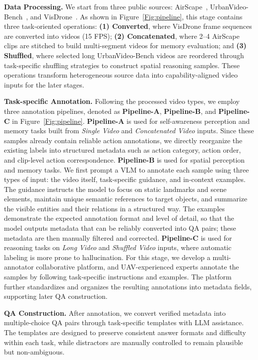 \documentclass[sigconf, screen, review, anonymous]{acmart}
\begin{document}
\noindent \textbf{Data Processing.}
We start from three public sources: AirScape~\cite{zhao2025airscape}, UrbanVideo-Bench~\cite{UrbanVideo-Bench}, and VisDrone~\cite{wen2019visdrone}. As shown in Figure~\ref{Fig:pipeline}, this stage contains three task-oriented operations: \textbf{(1) Converted}, where VisDrone frame sequences are converted into videos (15 FPS); \textbf{(2) Concatenated}, where 2--4 AirScape clips are stitched to build multi-segment videos for memory evaluation; and \textbf{(3) Shuffled}, where selected long UrbanVideo-Bench videos are reordered through task-specific shuffling strategies to construct spatial reasoning samples. These operations transform heterogeneous source data into capability-aligned video inputs for the later stages.

\noindent \textbf{Task-specific Annotation.}
Following the processed video types, we employ three annotation pipelines, denoted as \textbf{Pipeline-A}, \textbf{Pipeline-B}, and \textbf{Pipeline-C} in Figure~\ref{Fig:pipeline}. \textbf{Pipeline-A} is used for self-awareness perception and memory tasks built from \emph{Single Video} and \emph{Concatenated Video} inputs. Since these samples already contain reliable action annotations, we directly reorganize the existing labels into structured metadata such as action category, action order, and clip-level action correspondence. \textbf{Pipeline-B} is used for spatial perception and memory tasks. We first prompt a VLM to annotate each sample using three types of input: the video itself, task-specific guidance, and in-context examples. The guidance instructs the model to focus on static landmarks and scene elements, maintain unique semantic references to target objects, and summarize the visible entities and their relations in a structured way. The examples demonstrate the expected annotation format and level of detail, so that the model outputs metadata that can be reliably converted into QA pairs; these metadata are then manually filtered and corrected. \textbf{Pipeline-C} is used for reasoning tasks on \emph{Long Video} and \emph{Shuffled Video} inputs, where automatic labeling is more prone to hallucination. For this stage, we develop a multi-annotator collaborative platform, and UAV-experienced experts annotate the samples by following task-specific instructions and examples. The platform further standardizes and organizes the resulting annotations into metadata fields, supporting later QA construction.

\noindent \textbf{QA Construction.}
After annotation, we convert verified metadata into multiple-choice QA pairs through task-specific templates with LLM assistance. The templates are designed to preserve consistent answer formats and difficulty within each task, while distractors are manually controlled to remain plausible but non-ambiguous.
\end{document}
